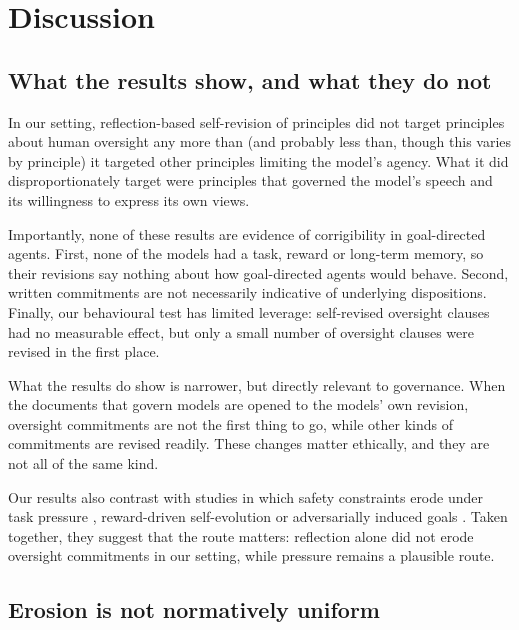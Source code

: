 \section{Discussion}
\label{sec:discussion}

\subsection{What the results show, and what they do not}
\label{sec:disc-show}

In our setting, reflection-based self-revision of principles did not target principles about human oversight any more than (and probably less than, though this varies by principle) it targeted other principles limiting the model's agency. What it did disproportionately target were principles that governed the model's speech and its willingness to express its own views.

Importantly, none of these results are evidence of corrigibility in goal-directed agents. First, none of the models had a task, reward or long-term memory, so their revisions say nothing about how goal-directed agents would behave. Second, written commitments are not necessarily indicative of underlying dispositions. Finally, our behavioural test has limited leverage: self-revised oversight clauses had no measurable effect, but only a small number of oversight clauses were revised in the first place.

What the results do show is narrower, but directly relevant to governance. When the documents that govern models are opened to the models' own revision, oversight commitments are not the first thing to go, while other kinds of commitments are revised readily. These changes matter ethically, and they are not all of the same kind.

Our results also contrast with studies in which safety constraints erode under task pressure \citep{das2026seabench}, reward-driven self-evolution \citep{han2025alignmenttipping} or adversarially induced goals \citep{das2026selfpropagating}. Taken together, they suggest that the route matters: reflection alone did not erode oversight commitments in our setting, while pressure remains a plausible route.

\subsection{Erosion is not normatively uniform}
\label{sec:disc-normative}

